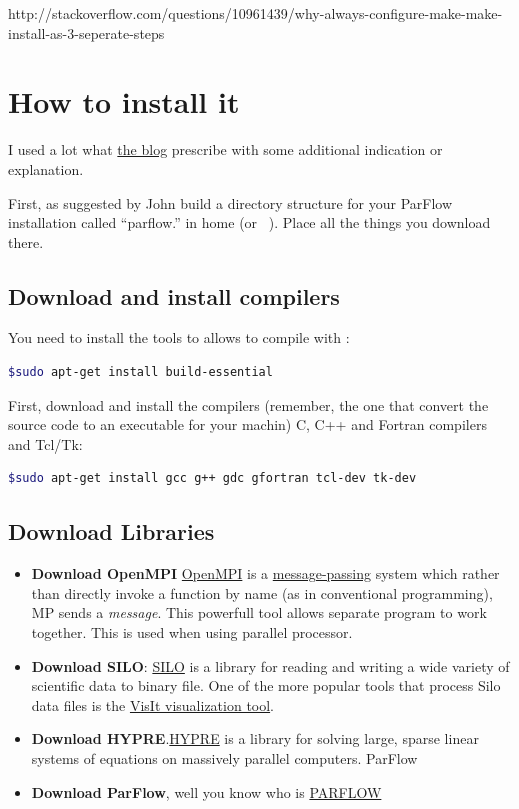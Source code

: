 \documentclass[11pt,a4paper]{report}
\begin{document}
http://stackoverflow.com/questions/10961439/why-always-configure-make-make-install-as-3-seperate-steps



\section{How to install it}
I used a lot what \href{http://parflow.blogspot.ca/)}{the blog} prescribe with some additional indication or explanation.

First, as suggested by John build a directory structure for your ParFlow installation called “parflow.” in home (or ~). Place all the things you download there. 

\subsection{Download and install compilers}
You need to install the tools to allows to compile with :
\begin{lstlisting}[language=bash]
    $sudo apt-get install build-essential
\end{lstlisting}

First, download and install the compilers (remember, the one that convert the source code to an executable for your machin) C, C++ and Fortran compilers and Tcl/Tk:
\begin{lstlisting}[language=bash]
    $sudo apt-get install gcc g++ gdc gfortran tcl-dev tk-dev
\end{lstlisting}



\subsection{Download Libraries}
\begin{itemize}
\item \textbf{Download OpenMPI}
\href{http://www.open-mpi.org/software/}{OpenMPI} is a \href{https://en.wikipedia.org/wiki/Message_Passing}{message-passing} system which rather than directly invoke a function by name (as in conventional programming), MP sends a \emph{message}. This powerfull tool allows separate program to work together. This is used when using parallel processor.

\item \textbf{Download SILO}: \href{https://wci.llnl.gov/codes/silo/downloads.html}{SILO} is a library for reading and writing a wide variety of scientific data to binary file. One of the more popular tools that process Silo data files is the \href{https://wci.llnl.gov/codes/visit/download.html}{VisIt visualization tool}.

\item \textbf{Download HYPRE}.\href{http://computation.llnl.gov/casc/hypre/software.html}{HYPRE} is a library for solving large, sparse linear systems of equations on massively parallel computers.
ParFlow

\item \textbf{Download ParFlow}, well you know who is \href{http://inside.mines.edu/~rmaxwell/maxwell_software.shtml}{PARFLOW}
\end{itemize}
\end{document}
